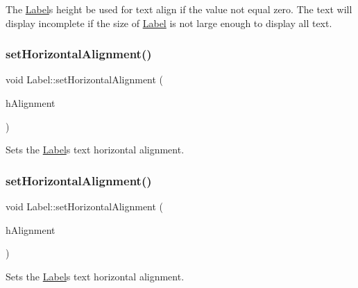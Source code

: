 The \hyperlink{classLabel}{Label}\textquotesingle{}s height be used for text align if the value not equal zero. The text will display incomplete if the size of \hyperlink{classLabel}{Label} is not large enough to display all text. \mbox{\label{classLabel_a53f1b4d0796e3e538f7e40f1f5badbb1}} 
\subsubsection{\texorpdfstring{set\+Horizontal\+Alignment()}{setHorizontalAlignment()}\hspace{0.1cm}{\footnotesize\ttfamily [1/2]}}
{\footnotesize\ttfamily void Label\+::set\+Horizontal\+Alignment (\begin{DoxyParamCaption}\item[{Text\+H\+Alignment}]{h\+Alignment }\end{DoxyParamCaption})\hspace{0.3cm}{\ttfamily [inline]}}

Sets the \hyperlink{classLabel}{Label}\textquotesingle{}s text horizontal alignment. \mbox{\label{classLabel_a53f1b4d0796e3e538f7e40f1f5badbb1}} 
\subsubsection{\texorpdfstring{set\+Horizontal\+Alignment()}{setHorizontalAlignment()}\hspace{0.1cm}{\footnotesize\ttfamily [2/2]}}
{\footnotesize\ttfamily void Label\+::set\+Horizontal\+Alignment (\begin{DoxyParamCaption}\item[{Text\+H\+Alignment}]{h\+Alignment }\end{DoxyParamCaption})\hspace{0.3cm}{\ttfamily [inline]}}

Sets the \hyperlink{classLabel}{Label}\textquotesingle{}s text horizontal alignment. \mbox{\label{classLabel_aa6ea9a4b8d81b4c14e44fdd3a862073f}} 
